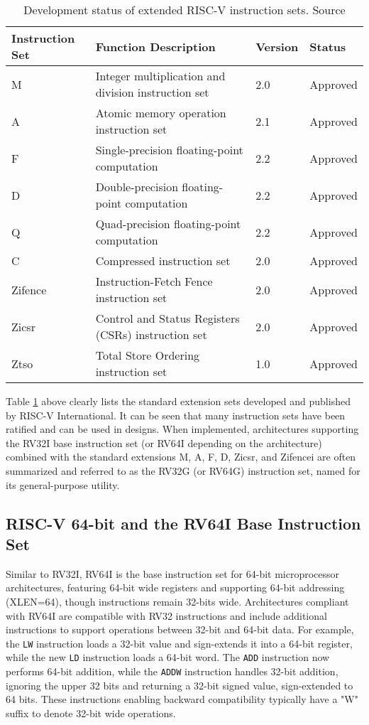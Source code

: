 \begin{table}[h!]
    \centering
    \caption{Development status of extended RISC-V instruction sets. Source \cite{riscv:manual:user:2024}}
    \label{tab:extension_status}
    \begin{tabular}{llll}
    \toprule
    \textbf{Instruction Set} & \textbf{Function Description} & \textbf{Version} & \textbf{Status} \\
    \midrule
    M & Integer multiplication and division instruction set & 2.0 & Approved \\
    A & Atomic memory operation instruction set & 2.1 & Approved \\
    F & Single-precision floating-point computation & 2.2 & Approved \\
    D & Double-precision floating-point computation & 2.2 & Approved \\
    Q & Quad-precision floating-point computation & 2.2 & Approved \\
    C & Compressed instruction set & 2.0 & Approved \\
    Zifence & Instruction-Fetch Fence instruction set & 2.0 & Approved \\
    Zicsr & Control and Status Registers (CSRs) instruction set & 2.0 & Approved \\
    Ztso & Total Store Ordering instruction set & 1.0 & Approved \\
    \bottomrule
    \end{tabular}
\end{table}

Table \ref{tab:extension_status} above clearly lists the standard extension sets developed and published by RISC-V International. It can be seen that many instruction sets have been ratified and can be used in designs. When implemented, architectures supporting the RV32I base instruction set (or RV64I depending on the architecture) combined with the standard extensions M, A, F, D, Zicsr, and Zifencei are often summarized and referred to as the RV32G (or RV64G) instruction set, named for its general-purpose utility.

\subsection{RISC-V 64-bit and the RV64I Base Instruction Set}

Similar to RV32I, RV64I is the base instruction set for 64-bit microprocessor architectures, featuring 64-bit wide registers and supporting 64-bit addressing (XLEN=64), though instructions remain 32-bits wide. Architectures compliant with RV64I are compatible with RV32 instructions and include additional instructions to support operations between 32-bit and 64-bit data. For example, the \texttt{LW} instruction loads a 32-bit value and sign-extends it into a 64-bit register, while the new \texttt{LD} instruction loads a 64-bit word. The \texttt{ADD} instruction now performs 64-bit addition, while the \texttt{ADDW} instruction handles 32-bit addition, ignoring the upper 32 bits and returning a 32-bit signed value, sign-extended to 64 bits. These instructions enabling backward compatibility typically have a "W" suffix to denote 32-bit wide operations.

